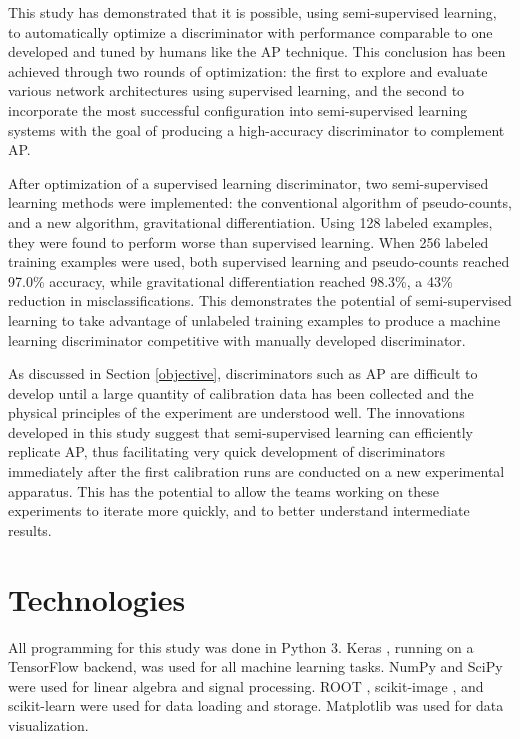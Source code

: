 \documentclass[10pt]{article}
\begin{document}
This study has demonstrated that it is possible, using semi-supervised learning, to automatically optimize a discriminator with performance comparable to one developed and tuned by humans like the AP technique. This conclusion has been achieved through two rounds of optimization: the first to explore and evaluate various network architectures using supervised learning, and the second to incorporate the most successful configuration into semi-supervised learning systems with the goal of producing a high-accuracy discriminator to complement AP.

After optimization of a supervised learning discriminator, two semi-supervised learning methods were implemented: the conventional algorithm of pseudo-counts, and a new algorithm, gravitational differentiation. Using 128 labeled examples, they were found to perform worse than supervised learning. When 256 labeled training examples were used, both supervised learning and pseudo-counts reached 97.0\% accuracy, while gravitational differentiation reached 98.3\%, a 43\% reduction in misclassifications. This demonstrates the potential of semi-supervised learning to take advantage of unlabeled training examples to produce a machine learning discriminator competitive with manually developed discriminator.

As discussed in Section \ref{objective}, discriminators such as AP are difficult to develop until a large quantity of calibration data has been collected and the physical principles of the experiment are understood well. The innovations developed in this study suggest that semi-supervised learning can efficiently replicate AP, thus facilitating very quick development of discriminators immediately after the first calibration runs are conducted on a new experimental apparatus. This has the potential to allow the teams working on these experiments to iterate more quickly, and to better understand intermediate results.

\section{Technologies} \label{technologies}

All programming for this study was done in Python 3. Keras \cite{keras}, running on a TensorFlow \cite{tensorflow} backend, was used for all machine learning tasks. NumPy \cite{numpy} and SciPy \cite{scipy} were used for linear algebra and signal processing. ROOT \cite{root}, scikit-image \cite{scikit-image}, and scikit-learn \cite{scikit-learn} were used for data loading and storage. Matplotlib \cite{matplotlib} was used for data visualization.
\end{document}
